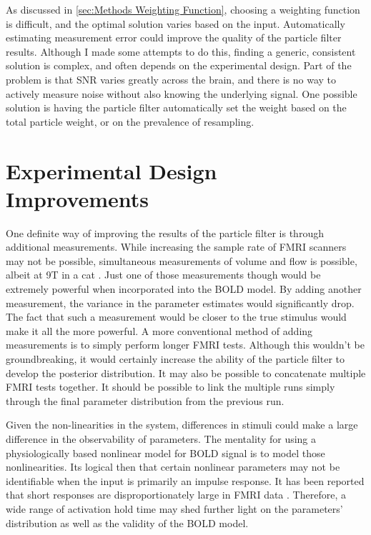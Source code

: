 As discussed in \autoref{sec:Methods Weighting Function}, choosing a weighting
function is difficult, and the optimal solution varies based on the input.
Automatically estimating measurement error could improve
the quality of the particle filter results. Although I made some attempts to do
this, finding a generic, consistent solution is complex, and often depends on the
experimental design. Part of the problem is that SNR varies greatly across
the brain, and there is no way to actively measure noise without also knowing
the underlying signal. One possible solution is having the particle filter automatically
set the weight based on the total particle weight, or on the prevalence of resampling.
 
\section{Experimental Design Improvements}
\label{sec:Sideways Measurements}
One definite way of improving the results of the particle filter is through
additional measurements. While increasing the sample rate of FMRI scanners may
not be possible, simultaneous measurements of volume and flow is
possible, albeit at 9T in a cat \cite{Hu2009}. Just one of those measurements
though would be extremely powerful when incorporated into the BOLD
model. By adding another measurement, the
variance in the parameter estimates would significantly drop. The fact
that such a measurement would be closer to the true stimulus would make it
all the more powerful. 
A more conventional method of adding measurements is to 
simply perform longer FMRI tests. Although this wouldn't be 
groundbreaking, it would certainly increase the ability of the 
particle filter to develop the posterior distribution. 
It may also be possible to concatenate multiple FMRI tests together.
It should be possible to link the multiple runs simply through
the final parameter distribution from the previous run. 

Given the non-linearities in the system, differences in stimuli
could make a large difference in the observability of parameters. The mentality 
for using a physiologically based nonlinear model for BOLD signal is to model 
those nonlinearities. Its logical then that certain nonlinear parameters may not
be identifiable when the input is primarily an impulse response. It 
has been reported that short responses are disproportionately large 
in FMRI data \cite{Miller2001, Deneux2006}. Therefore,
a wide range of activation hold time may shed further light on 
the parameters' distribution as well as the validity of the BOLD model. 

